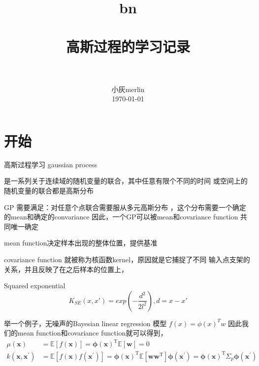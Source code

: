 \documentclass[a4paper, 12pt, CJKnumber, UTF8, openany,nofonts, fancyhdr]{ctexbook}
\title{
        \usefont{OT1}{bch} {b}{n}
        \normalfont \normalsize \textsc{} \\ [25pt]
        \horrule{1.5pt} \\[0.4cm]
        \huge 高斯过程的学习记录\\
        \horrule{1.5pt} \\[0.5cm]
}
\author {
        \normalfont                                 \normalsize
        小灰merlin\\[-2pt]      \normalsize
        \today
}
\date{}
\begin{document}
\linespread{1.69}\selectfont
\maketitle
\eject
\tableofcontents
\eject

\frontmatter %
\linespread{1.4}


\selectfont
\renewcommand*{\contentsname}{目\qquad 录}
\renewcommand*\listfigurename{\textbf{插\ 图\ 目\ 录}}
\renewcommand*\listtablename{\textbf{表\ 格\ 目\ 录}}
\renewcommand*\bibname{\textbf{参\ 考\ 文\ 献}}

\mainmatter %
\linespread{1.5}\selectfont
\setlength{\topskip}{0mm}
\newcommand{\upcite}[1]{\textsuperscript{\textsuperscript{\cite{#1}}}}

\section{开始}
高斯过程学习
gaussian process

是一系列关于连续域的随机变量的联合，其中任意有限个不同的时间
或空间上的随机变量的联合都是高斯分布

GP 需要满足：对任意个点联合需要服从多元高斯分布
，这个分布需要一个确定的mean和确定的convariance
因此，一个GP可以被mean和covariance function 共同唯一确定

mean function决定样本出现的整体位置，提供基准

covariance function 就被称为核函数kernel，原因就是它捕捉了不同
输入点支架的关系，并且反映了在之后样本的位置上，

Squared exponential 
\begin{equation}
K_{SE}(x,x') = exp(-\frac{d^2}{2l^2}), d = x-x'
\end{equation}

举一个例子，无噪声的Bayesian linear regression 模型
$f(x) =\phi(x)^Tw$ 因此我们的mean function和covariance function就可以得到，
\begin{equation}
  \begin{aligned} \mu(\boldsymbol{x}) &=\mathbb{E}[f(\boldsymbol{x})]=\boldsymbol{\phi}(\boldsymbol{x})^{\mathrm{T}} \mathbb{E}[\boldsymbol{w}]=0 \\ k\left(\boldsymbol{x}, \boldsymbol{x}^{\prime}\right) &=\mathbb{E}\left[f(\boldsymbol{x}) f\left(\boldsymbol{x}^{\prime}\right)\right]=\boldsymbol{\phi}(\boldsymbol{x})^{\mathrm{T}} \mathbb{E}\left[\boldsymbol{w} \boldsymbol{w}^{\mathrm{T}}\right] \boldsymbol{\phi}\left(\boldsymbol{x}^{\prime}\right)=\boldsymbol{\phi}(\boldsymbol{x})^{\mathrm{T}} \Sigma_{p} \boldsymbol{\phi}\left(\boldsymbol{x}^{\prime}\right) \end{aligned}
\end{equation}
\end{document}
